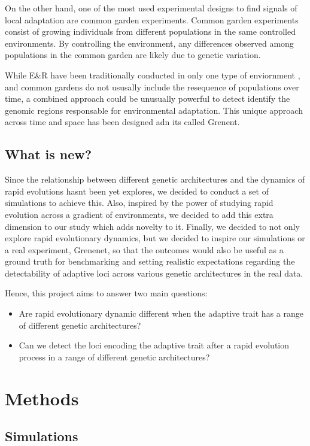 \documentclass{article}
\begin{document}
On the other hand, one of the most used experimental designs to find signals of local adaptation are common garden experiments. Common garden experiments consist of growing individuals from different populations in the same controlled environments. By controlling the environment, any differences observed among populations in the common garden are likely due to genetic variation.

While E\&R have been traditionally conducted in only one type of enviornment , and common gardens do not ususally include the resequence of populations over time, a combined approach could be unusually powerful to detect identify the genomic regions responsable for environmental adaptation. This unique approach across time and space has been designed adn its called Grenent. 

\subsection{What is new?}
Since the relationship between different genetic architectures and the dynamics of rapid evolutions hasnt been yet explores, we decided to conduct a set of simulations to achieve this. Also, inspired by the power of studying rapid evolution across a gradient of environments, we decided to add this extra dimension to our study which adds novelty to it. Finally, we decided to not only explore rapid evolutionary dynamics, but we decided to inspire our simulations or a real experiment, Grenenet, so that the outcomes would also be useful as a ground truth for benchmarking and setting realistic expectations regarding the detectability of adaptive loci across various genetic architectures in the real data. 

Hence, this project aims to answer two main questions: 
\begin{itemize}
    \item Are rapid evolutionary dynamic different when the adaptive trait has a range of different genetic architectures? 
    \item Can we detect the loci encoding the adaptive trait after a rapid evolution process in a range of different genetic architectures? 
\end{itemize}

\section{Methods}
\subsection{Simulations}
\end{document}
